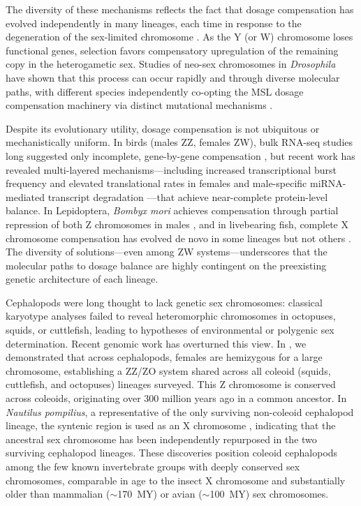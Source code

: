 \documentclass[12pt]{article}
\newcommand{\citep}{\parencite}
\begin{document}
The diversity of these mechanisms reflects the fact that dosage compensation
has evolved independently in many lineages,
each time in response to the degeneration of the sex-limited chromosome
\citep{lucchesi1978dosage}.
As the Y (or W) chromosome loses functional genes,
selection favors compensatory upregulation of the remaining copy
in the heterogametic sex.
Studies of neo-sex chromosomes in \textit{Drosophila} have shown
that this process can occur rapidly and through diverse molecular paths,
with different species independently co-opting the MSL dosage compensation machinery
via distinct mutational mechanisms \citep{ellison2019convergent}.

Despite its evolutionary utility, dosage compensation is not ubiquitous or mechanistically uniform.
In birds (males ZZ, females ZW), bulk RNA-seq studies long suggested only incomplete,
gene-by-gene compensation \citep{itoh2007dosage, mank2009w},
but recent work has revealed multi-layered mechanisms---including
increased transcriptional burst frequency and elevated translational rates in females
\citep{papanicolaou2025multilayered}
and male-specific miRNA-mediated transcript degradation
\citep{fallahshahroudi2025mirna}---that
achieve near-complete protein-level balance.
In Lepidoptera, \textit{Bombyx mori} achieves compensation
through partial repression of both Z chromosomes in males \citep{rosin2022dosage},
and in livebearing fish, complete X chromosome compensation
has evolved de novo in some lineages but not others \citep{darolti2019extreme}.
The diversity of solutions---even among ZW systems---underscores
that the molecular paths to dosage balance are highly contingent
on the preexisting genetic architecture of each lineage.

Cephalopods were long thought to lack genetic sex chromosomes:
classical karyotype analyses failed to reveal heteromorphic chromosomes
in octopuses, squids, or cuttlefish,
leading to hypotheses of environmental or polygenic sex determination.
Recent genomic work has overturned this view.
In \textcite{coffing2025cephalopod}, we demonstrated that across cephalopods,
females are hemizygous for a large chromosome,
establishing a ZZ/ZO system shared across all coleoid (squids, cuttlefish, and octopuses) lineages surveyed.
This Z chromosome is conserved across coleoids,
originating over 300 million years ago in a common ancestor.
In \textit{Nautilus pompilius}, a representative of the only surviving non-coleoid cephalopod lineage,
the syntenic region is used as an X chromosome \citep{torrado2025nautilus},
indicating that the ancestral sex chromosome has been independently repurposed
in the two surviving cephalopod lineages.
These discoveries position coleoid cephalopods among the few known invertebrate
groups with deeply conserved sex chromosomes,
comparable in age to the insect X chromosome \citep{toups2023x}
and substantially older than mammalian ($\sim$170~MY) or avian ($\sim$100~MY) sex chromosomes.
\end{document}
